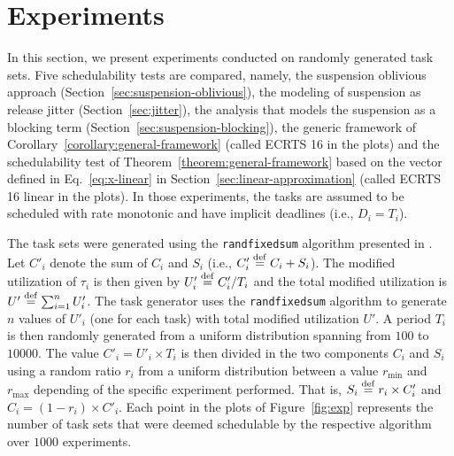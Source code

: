 \section{Experiments}
\label{sec:experiments}

In this section, we present experiments conducted on randomly generated task sets. Five schedulability tests are compared, namely, the suspension oblivious approach (Section~\ref{sec:suspension-oblivious}), the modeling of suspension as release jitter (Section~\ref{sec:jitter}), the analysis that models the suspension as a blocking term (Section~\ref{sec:suspension-blocking}), the generic framework of Corollary~\ref{corollary:general-framework} (called ECRTS 16 in the plots) and the schedulability test of Theorem~\ref{theorem:general-framework} based on the vector defined in Eq.~\eqref{eq:x-linear} in Section~\ref{sec:linear-approximation} (called ECRTS 16 linear in the plots). In those experiments, the tasks are assumed to be scheduled with rate monotonic and have implicit deadlines (i.e., $D_i = T_i$).

The task sets were generated using the \texttt{randfixedsum} algorithm presented in \cite{Emberson-taskSetGeneration-2010}. Let $C'_i$ denote the sum of $C_i$ and $S_i$ (i.e., $C'_i \stackrel{\mathrm{def}}{=} C_i + S_i$). 
The modified utilization of $\tau_i$ is then given by $U'_i \stackrel{\mathrm{def}}{=} C'_i/T_i$ and the total modified utilization is $U' \stackrel{\mathrm{def}}{=} \sum_{i=1}^n U'_i$. The task generator uses the \texttt{randfixedsum} algorithm to generate $n$ values of $U'_i$ (one for each task) with total modified utilization $U'$. A period $T_i$ is then randomly generated from a uniform distribution spanning from $100$ to $10000$. The value $C'_i = U'_i \times T_i$ is then divided in the two components $C_i$ and $S_i$ using a random ratio $r_i$ from a uniform distribution between a value $r_{\min}$ and $r_{\max}$ depending of the specific experiment performed. That is, $S_i \stackrel{\mathrm{def}}{=} r_i \times C'_i$ and $C_i = (1 - r_i) \times C'_i$. 
Each point in the plots of Figure~\ref{fig:exp} represents the number of task sets that were deemed schedulable by the respective algorithm over $1000$ experiments.

